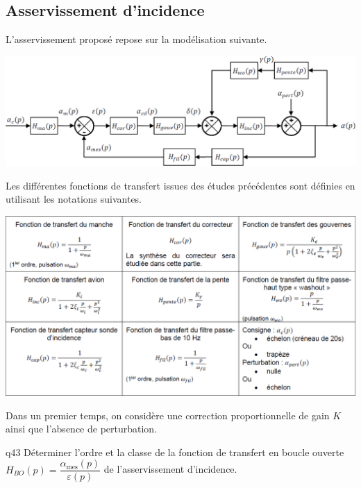 \begin{multicols}{2}
\subsection*{Asservissement d’incidence}
L’asservissement proposé repose sur la modélisation suivante.
\begin{center}
\includegraphics[width=\linewidth]{images/fig_21}
\end{center}
Les différentes fonctions de transfert issues des études précédentes sont définies en utilisant les notations
suivantes.

\begin{center}
\includegraphics[width=\linewidth]{images/fig_21_bis}
\end{center}

Dans un premier temps, on considère une correction proportionnelle de gain $K$ ainsi que l’absence de perturbation.


{\begin{question}{q43}
Déterminer l’ordre et la classe de la fonction de transfert en boucle ouverte
$H_{BO}(p)=\dfrac{\alpha_{\text{mes}}(p)}{\varepsilon(p)}$ de l’asservissement d’incidence.
\ifprof
\begin{corrige}
\end{corrige}
\else
\fi
\begin{reponses}
\end{reponses} \end{question}}  


\end{multicols}
